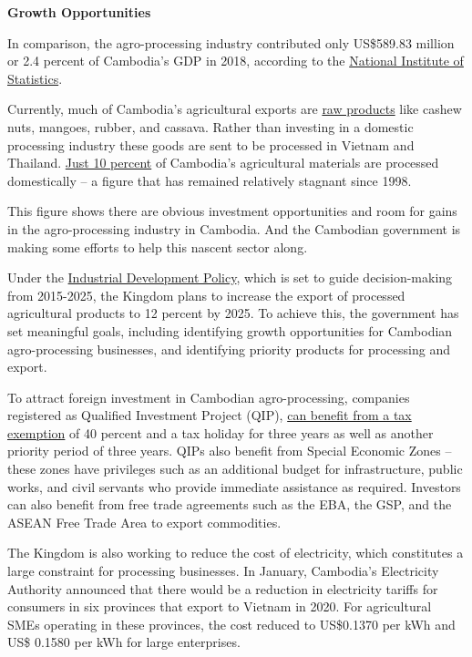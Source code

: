 \documentclass[10pt,a4paper]{letter}
\begin{document}
\textbf{Growth Opportunities}

In comparison, the agro-processing industry contributed only US\$589.83 million or 2.4 percent of Cambodia's GDP in 2018, according to the \href{https://www.nis.gov.kh/nis/NA/NA2018_Tab_files/TAB1-2.htm}{National Institute of Statistics}.

Currently, much of Cambodia's agricultural exports are \href{https://www.netherlandsworldwide.nl/binaries/en-nederlandwereldwijd/documents/publications/2018/10/04/agriculture-in-cambodia/Agriculture+in+Cambodia.pdf}{raw products} like cashew nuts, mangoes, rubber, and cassava. Rather than investing in a domestic processing industry these goods are sent to be processed in Vietnam and Thailand. \href{http://www.mih.gov.kh/File/UploadedFiles/12_9_2016_4_29_43.pdf}{Just 10 percent} of Cambodia's agricultural materials are processed domestically -- a figure that has remained relatively stagnant since 1998.

This figure shows there are obvious investment opportunities and room for gains in the agro-processing industry in Cambodia. And the Cambodian government is making some efforts to help this nascent sector along. 

Under the \href{http://www.mih.gov.kh/File/UploadedFiles/12_9_2016_4_29_43.pdf}{Industrial Development Policy}, which is set to guide decision-making from 2015-2025, the Kingdom plans to increase the export of processed agricultural products to 12 percent by 2025. To achieve this, the government has set meaningful goals, including identifying growth opportunities for Cambodian agro-processing businesses, and identifying priority products for processing and export.  

To attract foreign investment in Cambodian agro-processing, companies registered as Qualified Investment Project (QIP), \href{https://southeastasiaglobe.com/5-reasons-cambodia-is-best-in-the-region-for-foreign-investments/}{can benefit from a tax exemption} of 40 percent and a tax holiday for three years as well as another priority period of three years. QIPs also benefit from Special Economic Zones -- these zones have privileges such as an additional budget for infrastructure, public works, and civil servants who provide immediate assistance as required. Investors can also benefit from free trade agreements such as the EBA, the GSP, and the ASEAN Free Trade Area to export commodities. 

The Kingdom is also working to reduce the cost of electricity, which constitutes a large constraint for processing businesses. In January, Cambodia's Electricity Authority announced that there would be a reduction in electricity tariffs for consumers in six provinces that export to Vietnam in 2020. For agricultural SMEs operating in these provinces, the cost reduced to US\$0.1370 per kWh and US\$ 0.1580 per kWh for large enterprises.
\end{document}
